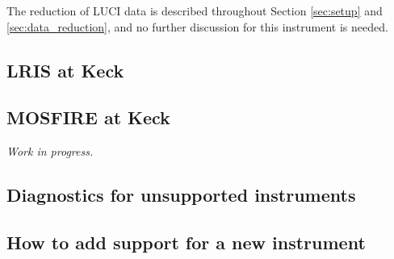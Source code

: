 \documentclass[a4paper]{article}
\begin{document}
\begin{sloppypar}
The reduction of LUCI data is described throughout Section \ref{sec:setup} and \ref{sec:data_reduction}, and no further discussion for this instrument is needed.


\subsection{LRIS at Keck}


\subsection{MOSFIRE at Keck}

\emph{Work in progress.}



\subsection{Diagnostics for unsupported instruments}
\label{sec:minimal}


\subsection{How to add support for a new instrument}





\end{sloppypar}
\end{document}
